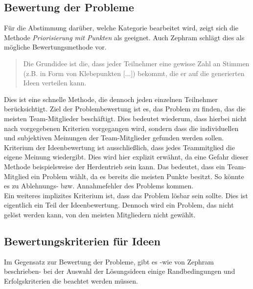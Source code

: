 \subsection{Bewertung der Probleme}\label{sec:retro-punkte}
Für die Abstimmung darüber, welche Kategorie bearbeitet wird, zeigt sich die Methode \textit{Priorisierung mit Punkten} 
als geeignet. Auch Zephram schlägt dies als mögliche Bewertungsmethode vor.
\begin{quote}
    Die Grundidee ist die, dass jeder Teilnehmer eine gewisse Zahl an Stimmen (z.B. in Form von Klebepunkten [...]) bekommt, die er auf die generierten Ideen verteilen kann. \cite{dotmocracy:2011}
\end{quote} 
Dies ist eine schnelle Methode, die dennoch jeden einzelnen Teilnehmer berücksichtigt. Ziel der Problembewertung ist es, das Problem zu 
finden, das die meisten Team-Mitglieder beschäftigt. Dies bedeutet wiederum, dass hierbei nicht nach vorgegebenen Kriterien 
vorgegangen wird, sondern dass die individuellen und subjektiven Meinungen der Team-Mitglieder gefunden werden sollen. 
Kriterium der Ideenbewertung ist ausschließlich, dass jedes Teammitglied die eigene Meinung wiedergibt. Dies wird hier explizit erwähnt, 
da eine Gefahr dieser Methode beispielsweise der Herdentrieb sein kann. Das bedeutet, dass ein Team-Mitglied 
ein Problem wählt, da es bereits die meisten Punkte besitzt. So könnte es zu Ablehnungs- bzw. Annahmefehler des Problems kommen. \cite{derby:2012}\\
Ein weiteres implizites Kriterium ist, dass das Problem lösbar sein sollte. Dies ist eigentlich ein Teil der Ideenbewertung.
Dennoch wird ein Problem, das nicht gelöst werden kann, von den meisten Mitgliedern nicht gewählt. 

\subsection{Bewertungskriterien für Ideen}\label{sec:retro-kriterien}
Im Gegensatz zur Bewertung der Probleme, gibt es -wie von Zephram beschrieben- bei der Auswahl der Lösungsideen einige Randbedingungen
und Erfolgskriterien die beachtet werden müssen.

